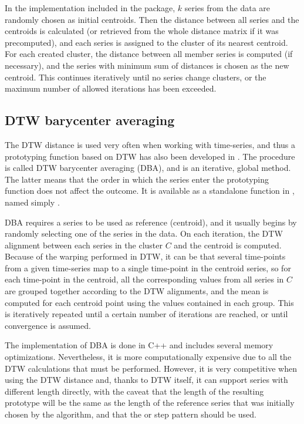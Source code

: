In the implementation included in the package,
$k$ series from the data are randomly chosen as initial centroids.
Then the distance between all series and the centroids is calculated
(or retrieved from the whole distance matrix if it was precomputed),
and each series is assigned to the cluster of its nearest centroid.
For each created cluster,
the distance between all member series is computed (if necessary),
and the series with minimum sum of distances is chosen as the new centroid.
This continues iteratively until no series change clusters,
or the maximum number of allowed iterations has been exceeded.

\subsection{DTW barycenter averaging}
\label{sec:dba}

The DTW distance is used very often when working with time-series,
and thus a prototyping function based on DTW has also been developed in \citet{petitjean2011}.
The procedure is called DTW barycenter averaging (DBA),
and is an iterative, global method.
The latter means that the order in which the series enter the prototyping function does not affect the outcome.
It is available as a standalone function in \dtwclust{}, named simply .

DBA requires a series to be used as reference (centroid),
and it usually begins by randomly selecting one of the series in the data.
On each iteration, the DTW alignment between each series in the cluster $C$ and the centroid is computed.
Because of the warping performed in DTW,
it can be that several time-points from a given time-series map to a single time-point in the centroid series,
so for each time-point in the centroid,
all the corresponding values from all series in $C$ are grouped together according to the DTW alignments,
and the mean is computed for each centroid point using the values contained in each group.
This is iteratively repeated until a certain number of iterations are reached,
or until convergence is assumed.

The \dtwclust{} implementation of DBA is done in C++ and includes several memory optimizations.
Nevertheless, it is more computationally expensive due to all the DTW calculations that must be performed.
However, it is very competitive when using the DTW distance and,
thanks to DTW itself,
it can support series with different length directly,
with the caveat that the length of the resulting prototype will be the same as the length of the reference series that was initially chosen by the algorithm,
and that the  or  step pattern should be used.

